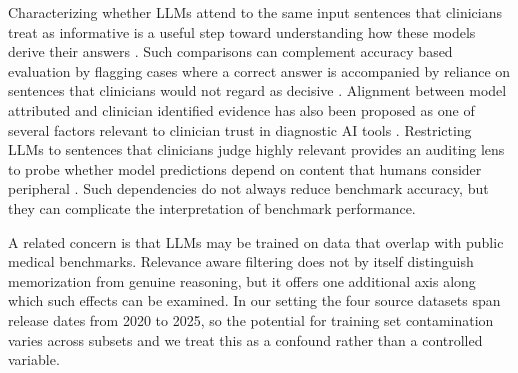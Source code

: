 \documentclass[fleqn,10pt]{wlscirep}
\begin{document}
Characterizing whether LLMs attend to the same input sentences that clinicians treat as informative is a useful step toward understanding how these models derive their answers \cite{strong_chatbot_2023, katz_gpt_2024}. Such comparisons can complement accuracy based evaluation by flagging cases where a correct answer is accompanied by reliance on sentences that clinicians would not regard as decisive \cite{chiang_can_2023, McCoy_NEJM_SCTBenchmark}. Alignment between model attributed and clinician identified evidence has also been proposed as one of several factors relevant to clinician trust in diagnostic AI tools \cite{huang2025trustworthiness, huang2026probellm}. Restricting LLMs to sentences that clinicians judge highly relevant provides an auditing lens to probe whether model predictions depend on content that humans consider peripheral \cite{zhou_explainable_2025, wu_medreason_2025, bansal_does_2021}. Such dependencies do not always reduce benchmark accuracy, but they can complicate the interpretation of benchmark performance.

A related concern is that LLMs may be trained on data that overlap with public medical benchmarks. Relevance aware filtering does not by itself distinguish memorization from genuine reasoning, but it offers one additional axis along which such effects can be examined. In our setting the four source datasets span release dates from 2020 to 2025, so the potential for training set contamination varies across subsets and we treat this as a confound rather than a controlled variable.
\end{document}
